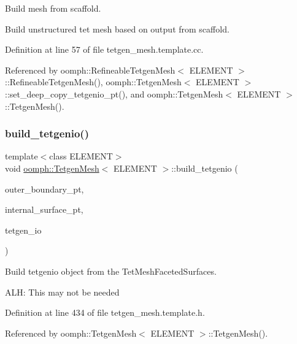 Build mesh from scaffold. 

Build unstructured tet mesh based on output from scaffold. 

Definition at line 57 of file tetgen\+\_\+mesh.\+template.\+cc.



Referenced by oomph\+::\+Refineable\+Tetgen\+Mesh$<$ E\+L\+E\+M\+E\+N\+T $>$\+::\+Refineable\+Tetgen\+Mesh(), oomph\+::\+Tetgen\+Mesh$<$ E\+L\+E\+M\+E\+N\+T $>$\+::set\+\_\+deep\+\_\+copy\+\_\+tetgenio\+\_\+pt(), and oomph\+::\+Tetgen\+Mesh$<$ E\+L\+E\+M\+E\+N\+T $>$\+::\+Tetgen\+Mesh().

\mbox{\label{classoomph_1_1TetgenMesh_a5a805a008ca5ae48af1aaae06de092b1}} 
\subsubsection{\texorpdfstring{build\+\_\+tetgenio()}{build\_tetgenio()}}
{\footnotesize\ttfamily template$<$class E\+L\+E\+M\+E\+NT$>$ \\
void \hyperlink{classoomph_1_1TetgenMesh}{oomph\+::\+Tetgen\+Mesh}$<$ E\+L\+E\+M\+E\+NT $>$\+::build\+\_\+tetgenio (\begin{DoxyParamCaption}\item[{Tet\+Mesh\+Faceted\+Surface $\ast$const \&}]{outer\+\_\+boundary\+\_\+pt,  }\item[{Vector$<$ Tet\+Mesh\+Faceted\+Surface $\ast$$>$ \&}]{internal\+\_\+surface\+\_\+pt,  }\item[{tetgenio \&}]{tetgen\+\_\+io }\end{DoxyParamCaption})\hspace{0.3cm}{\ttfamily [inline]}}



Build tetgenio object from the Tet\+Mesh\+Faceted\+Surfaces. 

A\+LH\+: This may not be needed 

Definition at line 434 of file tetgen\+\_\+mesh.\+template.\+h.



Referenced by oomph\+::\+Tetgen\+Mesh$<$ E\+L\+E\+M\+E\+N\+T $>$\+::\+Tetgen\+Mesh().

\mbox{\label{classoomph_1_1TetgenMesh_a93e764a63a21a93d4a2548058eb1a7c4}} 
